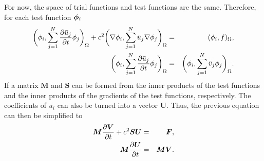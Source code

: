 For now, the space of trial functions and test functions are the same. Therefore, for each test function $\bm{\phi}_i$
\begin{eqnarray*}
  \bigg(\phi_i,\sum^N_{j=1}\frac{\partial\bar{u}_j}{\partial t}\phi_j\bigg)_\Omega + c^2\bigg(\nabla\phi_i,\sum^N_{j=1}\bar{u}_j\nabla\phi_j\bigg)_\Omega & = & (\phi_i,f)_\Omega, \\
  \bigg(\phi_i,\sum^N_{j=1}\frac{\partial\bar{u}_j}{\partial t}\phi_j\bigg)_\Omega & = & \bigg(\phi_i,\sum^N_{j=1}\bar{v}_j\phi_j\bigg)_\Omega.
\end{eqnarray*}
If a matrix $\bm{M}$ and $\bm{S}$ can be formed from the inner products of the test functions and the inner products of the gradients of the test functions, respectively. The coefficients of $\bar{u}_i$ can also be turned into a vector $\bm{U}$. Thus, the previous equation can then be simplified to
\begin{eqnarray}
  \label{eq::space_formulation}
  \bm{M}\frac{\partial\bm{V}}{\partial t} + c^2\bm{S}\bm{U} & = & \bm{F}, \nonumber \\
  \bm{M}\frac{\partial\bm{U}}{\partial t} & = & \bm{M}\bm{V}.
\end{eqnarray}
